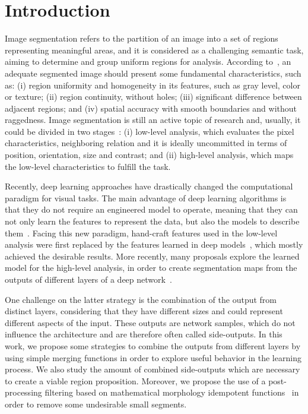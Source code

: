 \section{Introduction}
\label{sec:intro}

Image segmentation refers to the partition of an image into a set of regions representing  meaningful areas, and it is considered as a challenging semantic task, aiming to determine and group uniform regions for analysis. According to~\cite{DOMINGUEZ}, an adequate segmented image should present some fundamental characteristics, such as: (i) region uniformity and homogeneity in  its features, such as gray level, color or texture; (ii) region continuity, without holes; (iii) significant difference between adjacent regions; and (iv) spatial accuracy with smooth boundaries and without raggedness. Image segmentation is still an active topic of research and, usually, it could be divided in two stages~\cite{guigues06}: (i) low-level analysis, which evaluates the pixel characteristics, neighboring relation and it is ideally uncommitted in terms of position, orientation, size and contrast; and (ii) high-level analysis, which maps the low-level characteristics to fulfill the task.  

Recently, deep learning approaches have drastically changed the computational paradigm for visual tasks. The main advantage of deep learning algorithms is that they do not require an engineered model to operate, meaning that they can not only learn the features to represent the data, but also the models to describe them~\cite{goodfellow16}. Facing this new paradigm, hand-craft features used in the low-level analysis were first replaced by the features learned in deep models~\cite{farabet2013,simonyan2014,lee2015}, which mostly achieved the desirable results. More recently, many proposals explore the learned model for the high-level analysis, in order to create segmentation maps from the outputs of different layers of a deep network~\cite{xie2017,cheng2016,maninis2017,liu2017}. 

One challenge on the latter strategy is the combination of the output from distinct layers, considering that they have different sizes and could represent different aspects of the input. These outputs are network samples, which do not influence the architecture and are therefore often called side-outputs. In this work, we propose some strategies to combine the outputs from different layers by using simple merging functions in order to explore useful behavior in the learning process. We also study the amount of combined side-outputs which are necessary to create a viable region proposition. Moreover, we propose the use of a post-processing filtering based on mathematical morphology idempotent functions~\cite{najman13} in order to remove some undesirable small segments.



